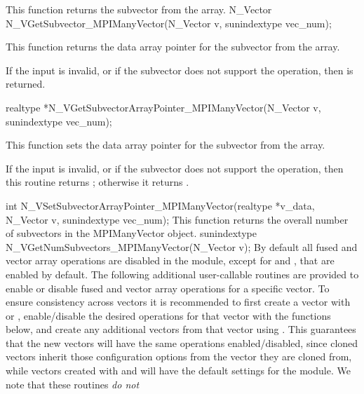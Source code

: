 {
  This function returns the  subvector from the {\nvector}
  array.
}
{
  N\_Vector N\_VGetSubvector\_MPIManyVector(N\_Vector v, sunindextype vec\_num);
}
{
  This function returns the data array pointer for the 
  subvector from the {\nvector} array.

  If the input  is invalid, or if the subvector does not
  support the  operation, then  is returned.
}
{
  realtype *N\_VGetSubvectorArrayPointer\_MPIManyVector(N\_Vector v, sunindextype vec\_num);
}
{
  This function sets the data array pointer for the 
  subvector from the {\nvector} array.

  If the input  is invalid, or if the subvector does not
  support the  operation, then this routine
  returns ; otherwise it returns .
}
{
  int N\_VSetSubvectorArrayPointer\_MPIManyVector(realtype *v\_data, N\_Vector v, sunindextype vec\_num);
}
{
  This function returns the overall number of subvectors in the
  MPIManyVector object.
}
{
  sunindextype N\_VGetNumSubvectors\_MPIManyVector(N\_Vector v);
}
By default all fused and vector array operations are disabled in the {\nvecmpimanyvector}
module, except for  and
, that are enabled by default. The
following additional user-callable routines are provided to enable or
disable fused and vector array operations for a specific vector. To
ensure consistency across vectors it is recommended to first create a
vector with  or ,
enable/disable the desired operations for that vector with the
functions below, and create any additional vectors from that vector
using . This guarantees that the new vectors will have
the same operations enabled/disabled, since cloned vectors inherit
those configuration options from the vector they are cloned from, while
vectors created with  and
 will have the default settings for the
{\nvecmpimanyvector} module.  We note that these routines \emph{do not} 
